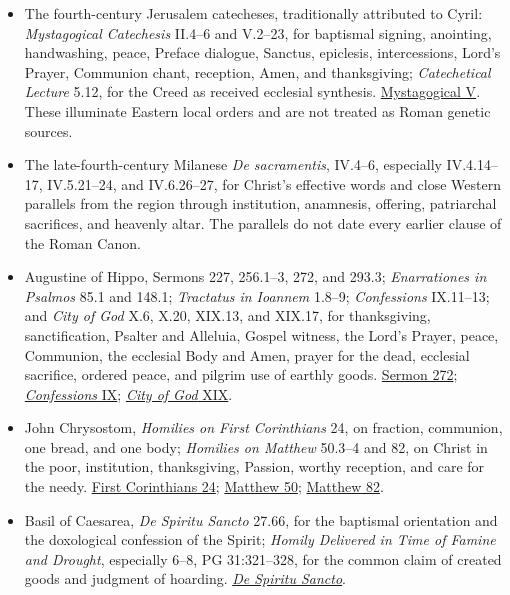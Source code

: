 \begin{itemize}
  \item The fourth-century Jerusalem catecheses, traditionally attributed to Cyril: \emph{Mystagogical Catechesis} II.4--6 and V.2--23, for baptismal signing, anointing, handwashing, peace, Preface dialogue, Sanctus, epiclesis, intercessions, Lord's Prayer, Communion chant, reception, Amen, and thanksgiving; \emph{Catechetical Lecture} 5.12, for the Creed as received ecclesial synthesis. \href{https://www.newadvent.org/fathers/310123.htm}{Mystagogical V}. These illuminate Eastern local orders and are not treated as Roman genetic sources.
  \item The late-fourth-century Milanese \emph{De sacramentis}, IV.4--6, especially IV.4.14--17, IV.5.21--24, and IV.6.26--27, for Christ's effective words and close Western parallels from the  region through institution, anamnesis, offering, patriarchal sacrifices, and heavenly altar. The parallels do not date every earlier clause of the Roman Canon.
  \item Augustine of Hippo, Sermons 227, 256.1--3, 272, and 293.3; \emph{Enarrationes in Psalmos} 85.1 and 148.1; \emph{Tractatus in Ioannem} 1.8--9; \emph{Confessions} IX.11--13; and \emph{City of God} X.6, X.20, XIX.13, and XIX.17, for thanksgiving, sanctification, Psalter and Alleluia, Gospel witness, the Lord's Prayer, peace, Communion, the ecclesial Body and Amen, prayer for the dead, ecclesial sacrifice, ordered peace, and pilgrim use of earthly goods. \href{https://earlychurchtexts.com/public/augustine_sermon_272_eucharist.htm}{Sermon 272}; \href{https://www.newadvent.org/fathers/110109.htm}{\emph{Confessions} IX}; \href{https://www.newadvent.org/fathers/120119.htm}{\emph{City of God} XIX}.
  \item John Chrysostom, \emph{Homilies on First Corinthians} 24, on fraction, communion, one bread, and one body; \emph{Homilies on Matthew} 50.3--4 and 82, on Christ in the poor, institution, thanksgiving, Passion, worthy reception, and care for the needy. \href{https://www.newadvent.org/fathers/220124.htm}{First Corinthians 24}; \href{https://www.newadvent.org/fathers/200150.htm}{Matthew 50}; \href{https://www.newadvent.org/fathers/200182.htm}{Matthew 82}.
  \item Basil of Caesarea, \emph{De Spiritu Sancto} 27.66, for the baptismal orientation and the doxological confession of the Spirit; \emph{Homily Delivered in Time of Famine and Drought}, especially 6--8, PG 31:321--328, for the common claim of created goods and judgment of hoarding. \href{https://www.newadvent.org/fathers/3203.htm}{\emph{De Spiritu Sancto}}.

\end{itemize}
